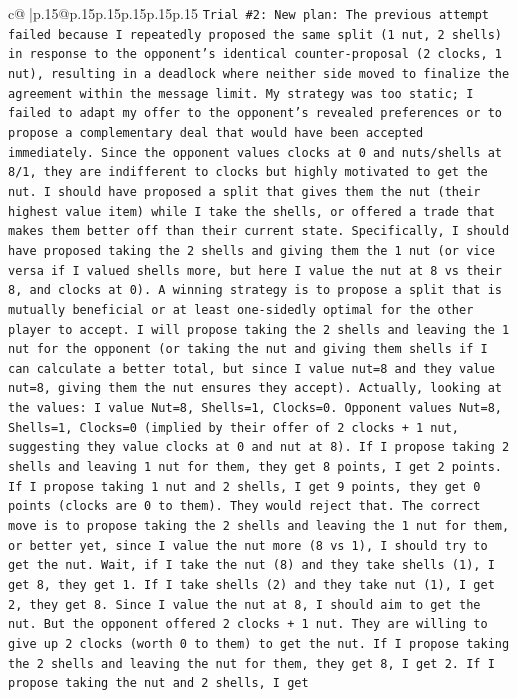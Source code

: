 \documentclass{article}
\begin{document}
{\begin{supertabular}{c@{$\;$}|p{.15\linewidth}@{}p{.15\linewidth}p{.15\linewidth}p{.15\linewidth}p{.15\linewidth}p{.15\linewidth}}
{{{\texttt{Trial \#2: New plan: The previous attempt failed because I repeatedly proposed the same split (1 nut, 2 shells) in response to the opponent's identical counter{-}proposal (2 clocks, 1 nut), resulting in a deadlock where neither side moved to finalize the agreement within the message limit. My strategy was too static; I failed to adapt my offer to the opponent's revealed preferences or to propose a complementary deal that would have been accepted immediately. Since the opponent values clocks at 0 and nuts/shells at 8/1, they are indifferent to clocks but highly motivated to get the nut. I should have proposed a split that gives them the nut (their highest value item) while I take the shells, or offered a trade that makes them better off than their current state. Specifically, I should have proposed taking the 2 shells and giving them the 1 nut (or vice versa if I valued shells more, but here I value the nut at 8 vs their 8, and clocks at 0). A winning strategy is to propose a split that is mutually beneficial or at least one{-}sidedly optimal for the other player to accept. I will propose taking the 2 shells and leaving the 1 nut for the opponent (or taking the nut and giving them shells if I can calculate a better total, but since I value nut=8 and they value nut=8, giving them the nut ensures they accept). Actually, looking at the values: I value Nut=8, Shells=1, Clocks=0. Opponent values Nut=8, Shells=1, Clocks=0 (implied by their offer of 2 clocks + 1 nut, suggesting they value clocks at 0 and nut at 8). If I propose taking 2 shells and leaving 1 nut for them, they get 8 points, I get 2 points. If I propose taking 1 nut and 2 shells, I get 9 points, they get 0 points (clocks are 0 to them). They would reject that. The correct move is to propose taking the 2 shells and leaving the 1 nut for them, or better yet, since I value the nut more (8 vs 1), I should try to get the nut. Wait, if I take the nut (8) and they take shells (1), I get 8, they get 1. If I take shells (2) and they take nut (1), I get 2, they get 8. Since I value the nut at 8, I should aim to get the nut. But the opponent offered 2 clocks + 1 nut. They are willing to give up 2 clocks (worth 0 to them) to get the nut. If I propose taking the 2 shells and leaving the nut for them, they get 8, I get 2. If I propose taking the nut and 2 shells, I get} \\
\\ 
}}}
\end{supertabular}}
\end{document}
